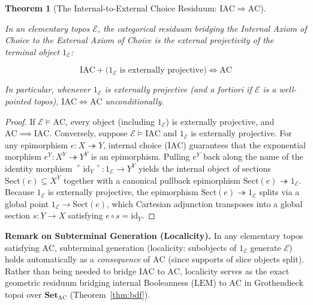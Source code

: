 \documentclass[10pt,twoside,openright]{book}
\theoremstyle{crmplain}
\newtheorem{theorem}{Theorem}[section]
\theoremstyle{crmdef}
\theoremstyle{crmremark}
\begin{document}
\begin{theorem}[The Internal-to-External Choice Residuum: $\mathrm{IAC} \Rightarrow \mathrm{AC}$]\label{thm:iac-to-ac}%
%

In an elementary topos $\mathcal{E}$, the categorical residuum bridging the Internal Axiom of Choice to the External Axiom of Choice is the external projectivity of the terminal object $1_{\mathcal{E}}$:

\[
  \mathrm{IAC} + \bigl(1_{\mathcal{E}} \text{ is externally projective}\bigr) \iff \mathrm{AC}
\]

In particular, whenever $1_{\mathcal{E}}$ is externally projective (and a fortiori if $\mathcal{E}$ is a well-pointed topos), $\mathrm{IAC} \iff \mathrm{AC}$ unconditionally.

\end{theorem}

\begin{proof}
If $\mathcal{E} \models \mathrm{AC}$, every object (including $1_{\mathcal{E}}$) is externally projective, and $\mathrm{AC} \implies \mathrm{IAC}$. Conversely, suppose $\mathcal{E} \models \mathrm{IAC}$ and $1_{\mathcal{E}}$ is externally projective. For any epimorphism $e: X \twoheadrightarrow Y$, internal choice ($\mathrm{IAC}$) guarantees that the exponential morphism $e^Y: X^Y \twoheadrightarrow Y^Y$ is an epimorphism. Pulling $e^Y$ back along the name of the identity morphism $\ulcorner \mathrm{id}_Y \urcorner: 1_{\mathcal{E}} \to Y^Y$ yields the internal object of sections $\mathrm{Sect}(e) \subseteq X^Y$ together with a canonical pullback epimorphism $\mathrm{Sect}(e) \twoheadrightarrow 1_{\mathcal{E}}$. Because $1_{\mathcal{E}}$ is externally projective, the epimorphism $\mathrm{Sect}(e) \twoheadrightarrow 1_{\mathcal{E}}$ splits via a global point $1_{\mathcal{E}} \to \mathrm{Sect}(e)$, which Cartesian adjunction transposes into a global section $s: Y \to X$ satisfying $e \circ s = \mathrm{id}_Y$.
\end{proof}

\noindent\textbf{Remark on Subterminal Generation (Localicity).} In any elementary topos satisfying $\mathrm{AC}$, subterminal generation (localicity: subobjects of $1_{\mathcal{E}}$ generate $\mathcal{E}$) holds automatically as a \emph{consequence} of $\mathrm{AC}$ (since supports of slice objects split). Rather than being needed to bridge $\mathrm{IAC}$ to $\mathrm{AC}$, localicity serves as the exact geometric residuum bridging internal Booleanness ($\mathrm{LEM}$) to $\mathrm{AC}$ in Grothendieck topoi over $\mathbf{Set}_{\mathrm{AC}}$ (Theorem~\ref{thm:bdf}).
\end{document}
